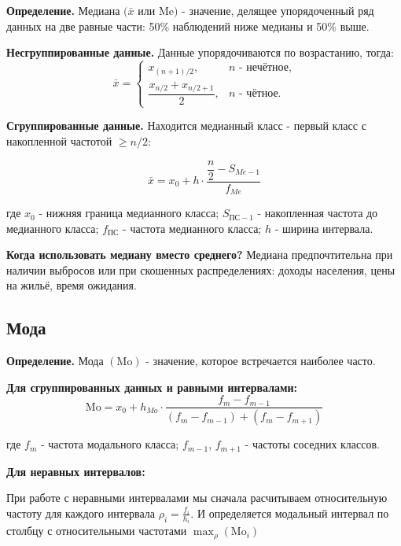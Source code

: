 \documentclass[a4paper]{article}
\begin{document}
	\textbf{Определение.} Медиана $(\bar{x}$ или $\text{Me})$ - значение,
	делящее упорядоченный ряд данных на две равные части: 50\% наблюдений ниже
	медианы и 50\% выше.


\noindent\textbf{Несгруппированные данные.}
Данные упорядочиваются по возрастанию, тогда:
\[
\bar{x} =
\begin{cases}
	x_{(n+1)/2}, & n \text{ - нечётное,}\\[4pt]
	\dfrac{x_{n/2} + x_{n/2+1}}{2}, & n \text{ - чётное.}
\end{cases}
\]

\noindent\textbf{Сгруппированные данные.}
Находится медианный класс - первый класс с накопленной частотой $\geq n/2$:

\begin{equation}
	\bar{x} = x_0 + h \cdot \frac{\dfrac{n}{2} - S_{Me-1}}{f_{Me}} 
\end{equation}

где $x_0$ - нижняя граница медианного класса;
$ S_{ПС-1}$ - накопленная частота до медианного класса;
${f_{ПС}}$ - частота медианного класса; $h$ - ширина интервала.


	\textbf{Когда использовать медиану вместо среднего?}
	Медиана предпочтительна при наличии выбросов или при скошенных распределениях: доходы населения, цены на жильё, время ожидания.


\subsection{Мода}


	\textbf{Определение.} Мода $(\text{Mo})$ - значение, которое
	встречается наиболее часто.


\noindent\textbf{Для сгруппированных данных и равными интервалами:}
\begin{equation}
	\text{Mo} = x_0 + h_{Mo} \cdot \frac{f_m - f_{m-1}}{(f_m - f_{m-1}) + (f_m - f_{m+1})} 
\end{equation}

где $f_m$ - частота модального класса;
$f_{m-1}$, $f_{m+1}$ - частоты соседних классов.

\noindent\textbf{Для неравных интервалов:}

При работе с неравными интервалами мы сначала расчитываем относительную частоту для каждого интервала $ \rho_i = \frac{f_i}{h_i} $. И определяется модальный интервал по столбцу с относительными частотами $ \max_{\rho}(\text{Mo}_i) $
\end{document}
